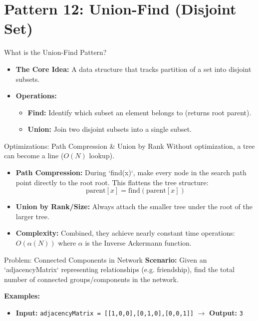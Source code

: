 \section{Pattern 12: Union-Find (Disjoint Set)}

\begin{frame}[c]{\empty}
    \begin{center}
        \Large\textbf{\secname}
    \end{center}
\end{frame}

\begin{frame}{What is the Union-Find Pattern?}
  \begin{itemize}
    \item \textbf{The Core Idea:} A data structure that tracks partition of a set into disjoint subsets.
    \item \textbf{Operations:}
      \begin{itemize}
        \item \textbf{Find:} Identify which subset an element belongs to (returns root parent).
        \item \textbf{Union:} Join two disjoint subsets into a single subset.
      \end{itemize}
  \end{itemize}
\end{frame}

\begin{frame}{Optimizations: Path Compression \& Union by Rank}
  Without optimization, a tree can become a line ($O(N)$ lookup).
  \begin{itemize}
    \item \textbf{Path Compression:} During `find(x)`, make every node in the search path point directly to the root root. This flattens the tree structure:
      $$\text{parent}[x] = \text{find}(\text{parent}[x])$$
    \item \textbf{Union by Rank/Size:} Always attach the smaller tree under the root of the larger tree.
    \item \textbf{Complexity:} Combined, they achieve nearly constant time operations: $O(\alpha(N))$ where $\alpha$ is the Inverse Ackermann function.
  \end{itemize}
\end{frame}

\begin{frame}[fragile]{Problem: Connected Components in Network}
  \textbf{Scenario:}
  Given an `adjacencyMatrix` representing relationships (e.g. friendship), find the total number of connected groups/components in the network.
  
  \vspace{0.3cm}
  \textbf{Examples:}
  \begin{itemize}
    \item \textbf{Input:} \texttt{adjacencyMatrix = [[1,0,0],[0,1,0],[0,0,1]]} $\rightarrow$ \textbf{Output:} \texttt{3}
  \end{itemize}
\end{frame}

